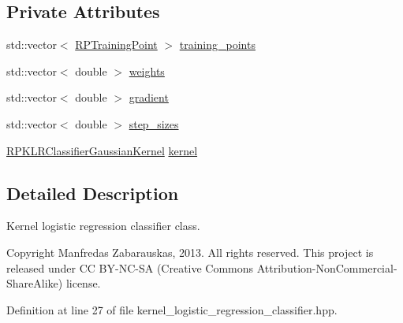 \subsection*{\-Private \-Attributes}
\begin{DoxyCompactItemize}
\item 
std\-::vector$<$ \hyperlink{struct_r_p_training_point}{\-R\-P\-Training\-Point} $>$ \hyperlink{class_r_p_kernel_logistic_regression_classifier_acbfcf7c3dc66d0bd1e1b1a11fc05f2b5}{training\-\_\-points}
\item 
std\-::vector$<$ double $>$ \hyperlink{class_r_p_kernel_logistic_regression_classifier_a0c1b9e50db833060a56d2bbeddcaac6b}{weights}
\item 
std\-::vector$<$ double $>$ \hyperlink{class_r_p_kernel_logistic_regression_classifier_a74b5ba4f13e20dbfe86ee0fd972d648a}{gradient}
\item 
std\-::vector$<$ double $>$ \hyperlink{class_r_p_kernel_logistic_regression_classifier_a9da47f0a98cf88d670eb3458c778f50a}{step\-\_\-sizes}
\item 
\hyperlink{class_r_p_k_l_r_classifier_gaussian_kernel}{\-R\-P\-K\-L\-R\-Classifier\-Gaussian\-Kernel} \hyperlink{class_r_p_kernel_logistic_regression_classifier_ae88d931ebd067f4a290913447a493962}{kernel}
\end{DoxyCompactItemize}


\subsection{\-Detailed \-Description}
\-Kernel logistic regression classifier class. 

\begin{DoxyCopyright}{\-Copyright}
\-Manfredas \-Zabarauskas, 2013. \-All rights reserved. \-This project is released under \-C\-C \-B\-Y-\/\-N\-C-\/\-S\-A (\-Creative \-Commons \-Attribution-\/\-Non\-Commercial-\/\-Share\-Alike) license. 
\end{DoxyCopyright}


\-Definition at line 27 of file kernel\-\_\-logistic\-\_\-regression\-\_\-classifier.\-hpp.



